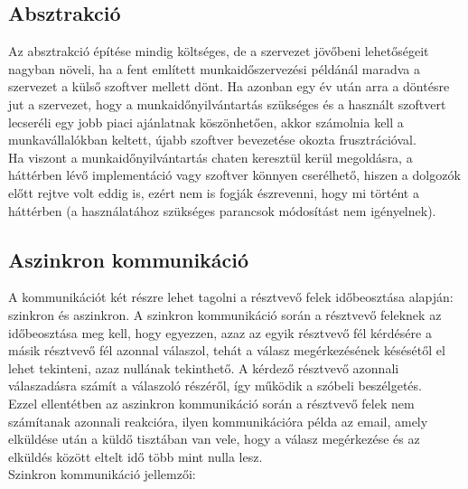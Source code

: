 \subsection*{Absztrakció}
Az absztrakció építése mindig költséges, de a szervezet jövőbeni lehetőségeit nagyban növeli, ha a fent említett munkaidőszervezési példánál maradva a szervezet a külső szoftver mellett dönt. Ha azonban egy év után arra a döntésre jut a szervezet, hogy a munkaidőnyilvántartás szükséges és a használt szoftvert lecseréli egy jobb piaci ajánlatnak köszönhetően, akkor számolnia kell a munkavállalókban keltett, újabb szoftver bevezetése okozta frusztrációval.\\
Ha viszont a munkaidőnyilvántartás chaten keresztül kerül megoldásra, a háttérben lévő implementáció vagy szoftver könnyen cserélhető, hiszen a dolgozók előtt rejtve volt eddig is, ezért nem is fogják észrevenni, hogy mi történt a háttérben (a használatához szükséges parancsok módosítást nem igényelnek).

\subsection*{Aszinkron kommunikáció}

A kommunikációt két részre lehet tagolni a résztvevő felek időbeosztása alapján: szinkron és aszinkron. A szinkron kommunikáció során a résztvevő feleknek az időbeosztása meg kell, hogy egyezzen, azaz az egyik résztvevő fél kérdésére a másik résztvevő fél azonnal válaszol, tehát a válasz megérkezésének késésétől el lehet tekinteni, azaz nullának tekinthető. A kérdező résztvevő azonnali válaszadásra számít a válaszoló részéről, így működik a szóbeli beszélgetés.\\
Ezzel ellentétben az aszinkron kommunikáció során a résztvevő felek nem számítanak azonnali reakcióra, ilyen kommunikációra példa az email, amely elküldése után a küldő tisztában van vele, hogy a válasz megérkezése és az elküldés között eltelt idő több mint nulla lesz.\\
\newline
Szinkron kommunikáció jellemzői:

